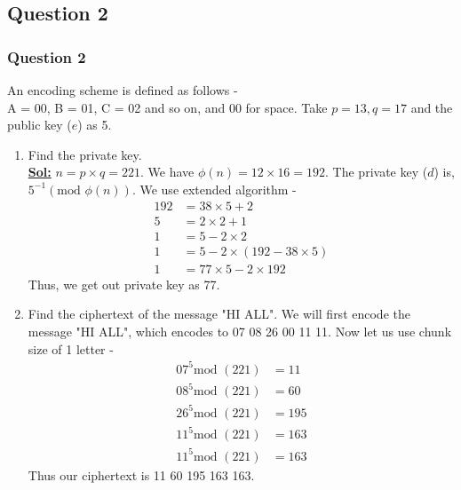 \documentclass[xcolor=svgnames]{beamer}
\begin{document}
\subsection{Question 2}
\begin{frame}
\frametitle{Question 2}
An encoding scheme is defined as follows - 
\\ A = 00, B = 01, C = 02 and so on, and 00 for space. Take $p = 13, q = 17$ and the public key ($e$) as 5. 
\begin{enumerate}
    \item Find the private key.
    \\ \textbf{\underline{Sol:}} $n = p \times q = 221$. We have $\phi (n) = 12\times 16 = 192$. The private key ($d$) is, $5^{-1} (\text{mod }\phi(n))$. We use extended algorithm - 
    \begin{align*}
        192 &= 38 \times 5 + 2 
        \\ 5 &= 2 \times 2 + 1
        \\ 1 &= 5 - 2 \times 2
        \\ 1 &= 5 - 2 \times (192 - 38 \times 5)
        \\ 1 &= 77 \times 5 - 2 \times 192
    \end{align*}
    Thus, we get out private key as 77.
\end{enumerate}
\end{frame}
\begin{frame}{}
\begin{enumerate}\setcounter{enumi}{1}
    \item Find the ciphertext of the message "HI ALL".
    We will first encode the message "HI ALL", which encodes to 07 08 26 00 11 11. Now let us use chunk size of 1 letter - 
    \begin{align*}
        07 ^ {5}  \text{mod }(221) &= 11
        \\ 08 ^ {5}  \text{mod }(221) &= 60
        \\ 26 ^ {5} \text{mod }(221) &= 195
        \\ 11 ^ {5}  \text{mod }(221) &= 163
        \\ 11 ^ {5}  \text{mod }(221) &= 163
    \end{align*}
    Thus our ciphertext is 11 60 195 163 163.
\end{enumerate}
\end{frame}
\end{document}
